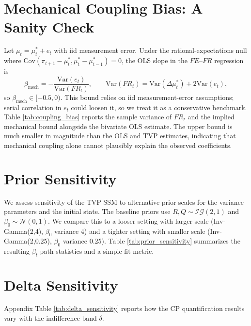 \documentclass[12pt]{article}
\begin{document}
\appendix
\section{Mechanical Coupling Bias: A Sanity Check}\label{sec:appendix_coupling}
Let $\mu_t=\mu^*_t+e_t$ with iid measurement error. Under the rational-expectations null where $\text{Cov}(\pi_{t+1}-\mu^*_t,\mu^*_t-\mu^*_{t-1})=0$, the OLS slope in the $FE$--$FR$ regression is
\[
    \beta_{\text{mech}} = -\frac{\text{Var}(e_t)}{\text{Var}(FR_t)},
    \qquad
    \text{Var}(FR_t)=\text{Var}(\Delta \mu^*_t)+2\text{Var}(e_t),
\]
so $\beta_{\text{mech}}\in[-0.5,0)$. This bound relies on iid measurement-error assumptions; serial correlation in $e_t$ could loosen it, so we treat it as a conservative benchmark. Table \ref{tab:coupling_bias} reports the sample variance of $FR_t$ and the implied mechanical bound alongside the bivariate OLS estimate. The upper bound is much smaller in magnitude than the OLS and TVP estimates, indicating that mechanical coupling alone cannot plausibly explain the observed coefficients.


\section{Prior Sensitivity}\label{sec:appendix_prior}
We assess sensitivity of the TVP-SSM to alternative prior scales for the variance parameters and the initial state. The baseline priors use $R,Q \sim \mathcal{IG}(2,1)$ and $\beta_0 \sim \mathcal{N}(0,1)$. We compare this to a looser setting with larger scale (Inv-Gamma(2,4), $\beta_0$ variance 4) and a tighter setting with smaller scale (Inv-Gamma(2,0.25), $\beta_0$ variance 0.25). Table \ref{tab:prior_sensitivity} summarizes the resulting $\beta_t$ path statistics and a simple fit metric.


\section{Delta Sensitivity}\label{sec:appendix_delta}
Appendix Table \ref{tab:delta_sensitivity} reports how the CP quantification results vary with the indifference band $\delta$.


\clearpage



\end{document}
